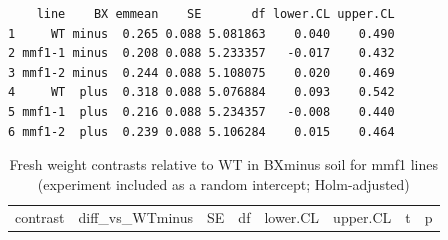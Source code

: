 \documentclass[
  10pt,
]{article}
\begin{document}
\begin{verbatim}
    line    BX emmean    SE       df lower.CL upper.CL
1     WT minus  0.265 0.088 5.081863    0.040    0.490
2 mmf1-1 minus  0.208 0.088 5.233357   -0.017    0.432
3 mmf1-2 minus  0.244 0.088 5.108075    0.020    0.469
4     WT  plus  0.318 0.088 5.076884    0.093    0.542
5 mmf1-1  plus  0.216 0.088 5.234357   -0.008    0.440
6 mmf1-2  plus  0.239 0.088 5.106284    0.015    0.464
\end{verbatim}

\begin{longtable}[]{@{}
  >{\raggedright\arraybackslash}p{}
  >{\raggedleft\arraybackslash}p{}
  >{\raggedleft\arraybackslash}p{}
  >{\raggedleft\arraybackslash}p{}
  >{\raggedleft\arraybackslash}p{}
  >{\raggedleft\arraybackslash}p{}
  >{\raggedleft\arraybackslash}p{}
  >{\raggedleft\arraybackslash}p{}@{}}
\caption{Fresh weight contrasts relative to WT in BXminus soil for mmf1
lines (experiment included as a random intercept;
Holm-adjusted)}\tabularnewline
\toprule\noalign{}
\begin{minipage}[b]{\linewidth}\raggedright
contrast
\end{minipage} & \begin{minipage}[b]{\linewidth}\raggedleft
diff\_vs\_WTminus
\end{minipage} & \begin{minipage}[b]{\linewidth}\raggedleft
SE
\end{minipage} & \begin{minipage}[b]{\linewidth}\raggedleft
df
\end{minipage} & \begin{minipage}[b]{\linewidth}\raggedleft
lower.CL
\end{minipage} & \begin{minipage}[b]{\linewidth}\raggedleft
upper.CL
\end{minipage} & \begin{minipage}[b]{\linewidth}\raggedleft
t
\end{minipage} & \begin{minipage}[b]{\linewidth}\raggedleft
p
\end{minipage} \\

\end{longtable}
\end{document}
